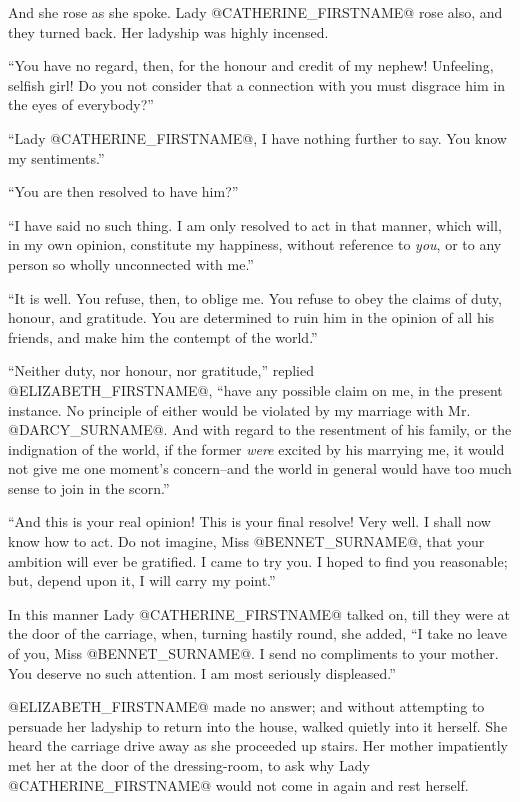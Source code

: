 And she rose as she spoke. Lady @CATHERINE_FIRSTNAME@ rose also, and they turned
back. Her ladyship was highly incensed.

``You have no regard, then, for the honour and credit of my nephew!
Unfeeling, selfish girl! Do you not consider that a connection with you
must disgrace him in the eyes of everybody?''

``Lady @CATHERINE_FIRSTNAME@, I have nothing further to say. You know my sentiments.''

``You are then resolved to have him?''

``I have said no such thing. I am only resolved to act in that manner,
which will, in my own opinion, constitute my happiness, without
reference to \textit{you}, or to any person so wholly unconnected with me.''

``It is well. You refuse, then, to oblige me. You refuse to obey the
claims of duty, honour, and gratitude. You are determined to ruin him in
the opinion of all his friends, and make him the contempt of the world.''

``Neither duty, nor honour, nor gratitude,'' replied @ELIZABETH_FIRSTNAME@, ``have any
possible claim on me, in the present instance. No principle of either
would be violated by my marriage with Mr. @DARCY_SURNAME@. And with regard to the
resentment of his family, or the indignation of the world, if the former
\textit{were} excited by his marrying me, it would not give me one moment's
concern--and the world in general would have too much sense to join in
the scorn.''

``And this is your real opinion! This is your final resolve! Very well.
I shall now know how to act. Do not imagine, Miss @BENNET_SURNAME@, that your
ambition will ever be gratified. I came to try you. I hoped to find you
reasonable; but, depend upon it, I will carry my point.''

In this manner Lady @CATHERINE_FIRSTNAME@ talked on, till they were at the door of
the carriage, when, turning hastily round, she added, ``I take no leave
of you, Miss @BENNET_SURNAME@. I send no compliments to your mother. You deserve
no such attention. I am most seriously displeased.''

@ELIZABETH_FIRSTNAME@ made no answer; and without attempting to persuade her
ladyship to return into the house, walked quietly into it herself. She
heard the carriage drive away as she proceeded up stairs. Her mother
impatiently met her at the door of the dressing-room, to ask why Lady
@CATHERINE_FIRSTNAME@ would not come in again and rest herself.

